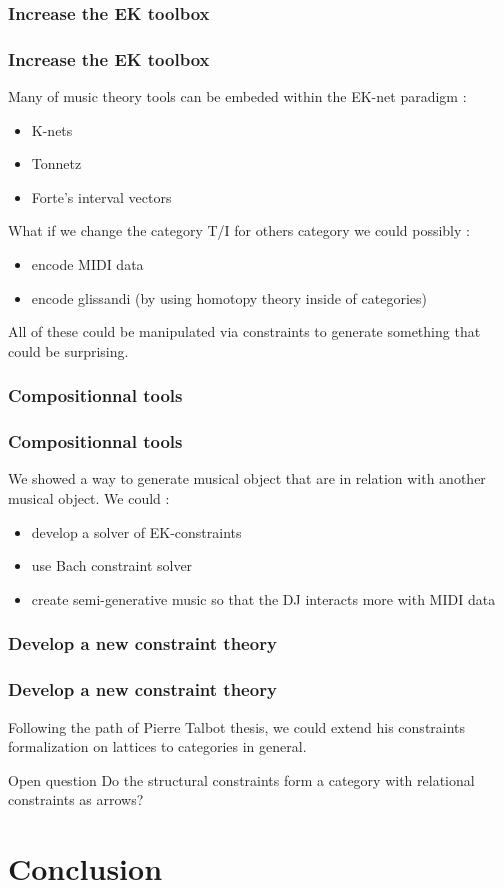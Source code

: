 \documentclass{beamer}
\begin{document}
\subsubsection{Increase the EK toolbox}
\begin{frame}
	\frametitle{Increase the EK toolbox}
	Many of music theory tools can be embeded within the EK-net paradigm : 
	\begin{itemize}
		\item K-nets
		\item Tonnetz
		\item Forte's interval vectors
	\end{itemize}
\pause
	What if we change the category T/I for others category we could possibly : 
	\begin{itemize}
		\item encode MIDI data
		\item encode glissandi (by using homotopy theory inside of categories)
	\end{itemize}

	All of these could be manipulated via constraints to generate something that could be surprising.
\end{frame}



\subsubsection{Compositionnal tools}
\begin{frame}
	\frametitle{Compositionnal tools}
	We showed a way to generate musical object that are in relation with another musical object.  We could : 
	\begin{itemize}
		\item develop a solver of EK-constraints
		\item use Bach constraint solver
		\item create semi-generative music so that the DJ interacts more with MIDI data
	\end{itemize}
\end{frame}

\subsubsection{Develop a new constraint theory}
\begin{frame}
	\frametitle{Develop a new constraint theory}
	Following the path of Pierre Talbot thesis, we could extend his constraints formalization on lattices to categories in general.

	\begin{exampleblock}{Open question}
		Do the structural constraints form a category with relational constraints as arrows?
	\end{exampleblock}
\end{frame}


\section{Conclusion}
\end{document}
